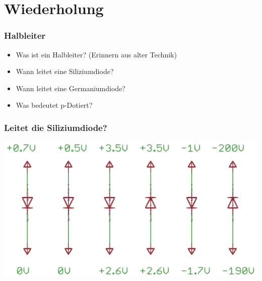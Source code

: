 

\subtitle{Technik A05: \\
           Die Diode und ihre Anwendungen \\[2em]}
\date{Stand 4.5.2015}



\section*{Wiederholung}

\begin{frame}
    \frametitle{Halbleiter}
      	\begin{itemize}
			\item Was ist ein Halbleiter? (Erinnern aus alter Technik)
			\item Wann leitet eine Siliziumdiode?
			\item Wann leitet eine Germaniumdiode?
			\item Was bedeutet p-Dotiert?
    \end{itemize}
\end{frame}

\begin{frame}
    \frametitle{Leitet die Siliziumdiode?}
    \begin{center}
        \includegraphics[width=1\textwidth]{a05/Leit_Diode.png}
	\end{center}
\end{frame}

